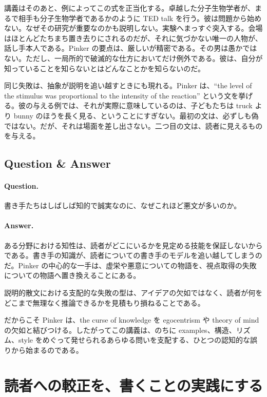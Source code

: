 講義はそのあと、例によってこの式を正当化する。卓越した分子生物学者が、まるで相手も分子生物学者であるかのように TED talk を行う。彼は問題から始めない。なぜその研究が重要なのかも説明しない。実験へまっすぐ突入する。会場はほとんどたちまち置き去りにされるのだが、それに気づかない唯一の人物が、話し手本人である。Pinker の要点は、厳しいが精密である。その男は愚かではない。ただし、一局所的で破滅的な仕方においてだけ例外である。彼は、自分が知っていることを知らないとはどんなことかを知らないのだ。

同じ失敗は、抽象が説明を追い越すときにも現れる。Pinker は、``the level of the stimulus was proportional to the intensity of the reaction'' という文を挙げる。彼の与える例では、それが実際に意味しているのは、子どもたちは truck より bunny のほうを長く見る、ということにすぎない。最初の文は、必ずしも偽ではない。だが、それは場面を差し出さない。二つ目の文は、読者に見えるものを与える。

\subsection{Question \& Answer}

\paragraph{Question.} 書き手たちはしばしば知的で誠実なのに、なぜこれほど悪文が多いのか。

\paragraph{Answer.} ある分野における知性は、読者がどこにいるかを見定める技能を保証しないからである。書き手の知識が、読者についての書き手のモデルを追い越してしまうのだ。Pinker の中心的な一手は、虚栄や悪意についての物語を、視点取得の失敗についての物語へ置き換えることにある。

\begin{proposition}
説明的散文における支配的な失敗の型は、アイデアの欠如ではなく、読者が何をどこまで無理なく推論できるかを見積もり損ねることである。
\end{proposition}

だからこそ Pinker は、the curse of knowledge を egocentrism や theory of mind の欠如と結びつける。したがってこの講義は、のちに examples、構造、リズム、style をめぐって発せられるあらゆる問いを支配する、ひとつの認知的な誤りから始まるのである。

\section{読者への較正を、書くことの実践にする}

